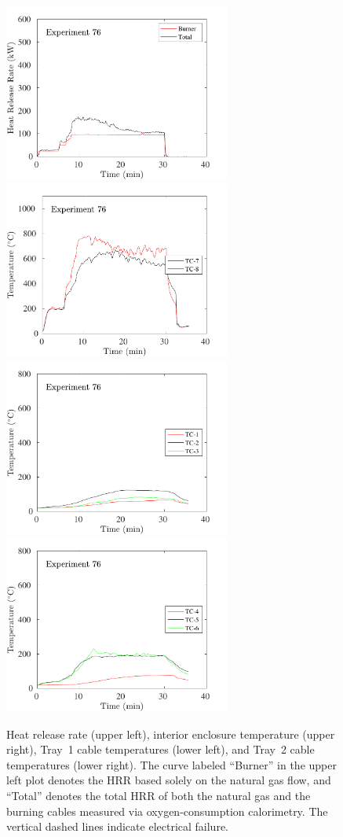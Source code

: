 \begin{figure}[H]
\includegraphics[height=2.30in]{../SCRIPT_FIGURES/Test_76_HRR} \hfill
\includegraphics[height=2.30in]{../SCRIPT_FIGURES/Test_76_TC_7-8} \\
\includegraphics[height=2.30in]{../SCRIPT_FIGURES/Test_76_TC_1-3} \hfill
\includegraphics[height=2.30in]{../SCRIPT_FIGURES/Test_76_TC_4-6}
\caption[HRR and temperatures of Experiment 76]{Heat release rate (upper left), interior enclosure temperature (upper right), Tray~1 cable temperatures (lower left), and Tray~2 cable temperatures (lower right). The curve labeled ``Burner'' in the upper left plot denotes the HRR based solely on the natural gas flow, and ``Total'' denotes the total HRR of both the natural gas and the burning cables measured via oxygen-consumption calorimetry. The vertical dashed lines indicate electrical failure.}
\label{fig:Test_76}
\end{figure}

